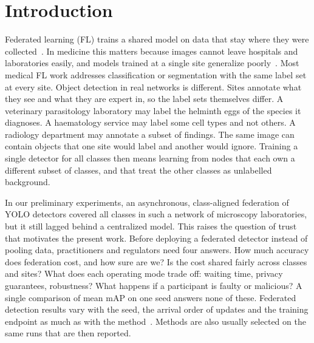 \documentclass[pdflatex,sn-mathphys-num]{sn-jnl}
\begin{document}

\maketitle

\section{Introduction}\label{sec:intro}

Federated learning (FL) trains a shared model on data that stay where they were collected~\cite{mcmahan2017fedavg,kairouz2021advances}. In medicine this matters because images cannot leave hospitals and laboratories easily, and models trained at a single site generalize poorly~\cite{rieke2020future,sheller2020federated,kaissis2020secure,dayan2021federated}. Most medical FL work addresses classification or segmentation with the same label set at every site. Object detection in real networks is different. Sites annotate what they see and what they are expert in, so the label sets themselves differ. A veterinary parasitology laboratory may label the helminth eggs of the species it diagnoses. A haematology service may label some cell types and not others. A radiology department may annotate a subset of findings. The same image can contain objects that one site would label and another would ignore. Training a single detector for all classes then means learning from nodes that each own a different subset of classes, and that treat the other classes as unlabelled background.

In our preliminary experiments, an asynchronous, class-aligned federation of YOLO detectors covered all classes in such a network of microscopy laboratories, but it still lagged behind a centralized model. This raises the question of trust that motivates the present work. Before deploying a federated detector instead of pooling data, practitioners and regulators need four answers. How much accuracy does federation cost, and how sure are we? Is the cost shared fairly across classes and sites? What does each operating mode trade off: waiting time, privacy guarantees, robustness? What happens if a participant is faulty or malicious? A single comparison of mean mAP on one seed answers none of these. Federated detection results vary with the seed, the arrival order of updates and the training endpoint as much as with the method~\cite{bouthillier2021variance}. Methods are also usually selected on the same runs that are then reported.
\end{document}
